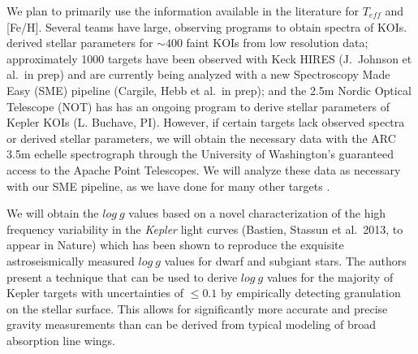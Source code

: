 
We plan to primarily use the information available in the literature
for $T_{eff}$ and [Fe/H].  Several teams have large, observing programs
to obtain spectra of KOIs.  \citet{Everett2013} derived stellar
parameters for $\sim 400$ faint KOIs from low resolution data;
approximately 1000 targets have been observed with Keck HIRES
(J.~Johnson et al.\ in prep) and are currently being analyzed with a
new Spectroscopy Made Easy (SME) pipeline (Cargile, Hebb et al.\ in
prep); and the 2.5m Nordic Optical Telescope (NOT) has has an ongoing
program to derive stellar parameters of Kepler KOIs (L. Buchave, PI).
However, if certain targets lack observed spectra or derived stellar
parameters, we will obtain the necessary data with the ARC 3.5m
echelle spectrograph through the University of Washington's guaranteed
access to the Apache Point Telescopes.  We will analyze these data as
necessary with our SME pipeline, as we have done for many other
targets \citep[i.e.][]{Wisniewski2012}.

We will obtain the $log~g$ values based on a novel characterization of
the high frequency variability in the {\it Kepler} light curves
(Bastien, Stassun et al.\ 2013, to appear in Nature) which has been
shown to reproduce the exquisite astroseismically measured $log~g$
values \citep{Huber2013} for dwarf and subgiant stars.  The authors
present a technique that can be used to derive $log~g$ values for the
majority of Kepler targets with uncertainties of $\le 0.1$ by
empirically detecting granulation on the stellar surface.  This allows
for significantly more accurate and precise gravity measurements than
can be derived from typical modeling of broad absorption line wings.

